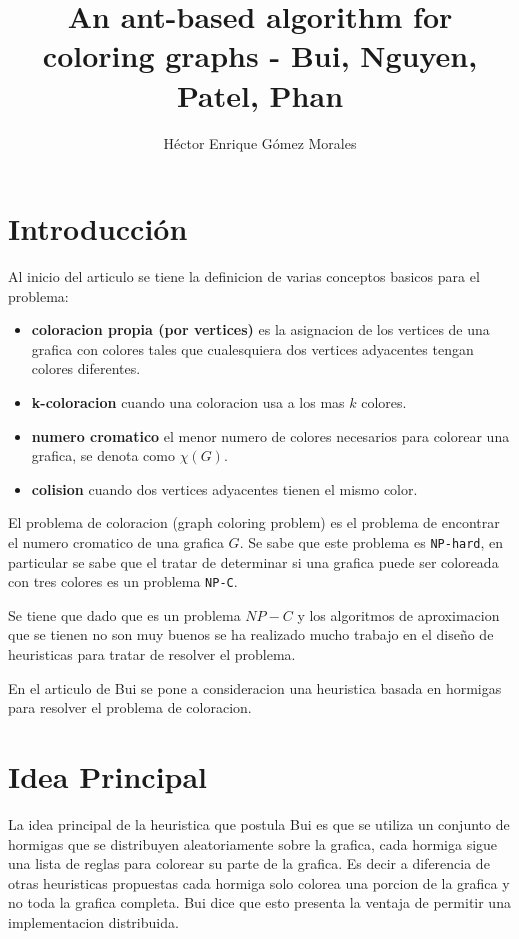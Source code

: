\documentclass{article}
\author{Héctor Enrique Gómez Morales}
\title{An ant-based algorithm for coloring graphs - Bui, Nguyen, Patel, Phan}
\begin{document}
\maketitle
\section{Introducción}
Al inicio del articulo se tiene la definicion de varias conceptos basicos para el problema:

\begin{itemize}
  \item \textbf{coloracion propia (por vertices)} es la asignacion de los vertices de una grafica con colores tales que cualesquiera dos vertices adyacentes tengan colores diferentes.
  \item \textbf{k-coloracion} cuando una coloracion usa a los mas $k$ colores.
  \item \textbf{numero cromatico} el menor numero de colores necesarios para colorear una grafica, se denota como $\chi(G)$.
  \item \textbf{colision} cuando dos vertices adyacentes tienen el mismo color.
\end{itemize}

El problema de coloracion (graph coloring problem) es el problema de encontrar el numero cromatico de una grafica $G$. Se sabe que este problema es \texttt{NP-hard}, en particular se sabe que el tratar de determinar si una grafica puede ser coloreada con tres colores es un problema \texttt{NP-C}.

Se tiene que dado que es un problema $NP-C$ y los algoritmos de aproximacion que se tienen no son muy buenos se ha realizado mucho trabajo en el diseño de heuristicas para tratar de resolver el problema.

En el articulo de Bui se pone a consideracion una heuristica basada en hormigas para resolver el problema de coloracion.

\section{Idea Principal}
La idea principal de la heuristica que postula Bui es que se utiliza un conjunto de hormigas que se distribuyen aleatoriamente sobre la grafica, cada hormiga sigue una lista de reglas para colorear su parte de la grafica. Es decir a diferencia de otras heuristicas propuestas cada hormiga solo colorea una porcion de la grafica y no toda la grafica completa. Bui dice que esto presenta la ventaja de permitir una implementacion distribuida.
\end{document}
